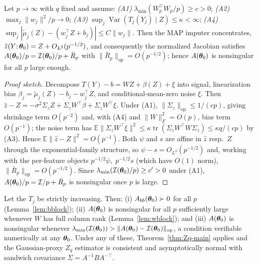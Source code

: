 \documentclass[twoside,11pt]{article}
\begin{document}
\begin{lemma}
\label{lem:wblock}
Let $p\to\infty$ with $q$ fixed and assume: \emph{(A1)} $\lambda_{\min}(W_p^\top W_p/p)\ge c>0$; \emph{(A2)} $\max_j\|w_j\|^2/p\to0$; \emph{(A3)} $\sup_j\operatorname{Var}(T_j(Y_j)\mid Z)\le\kappa<\infty$; \emph{(A4)} $\sup_j|\tilde\mu_j(Z)-(w_j^\top Z+b_j)|\le C\|w_j\|$. Then the MAP imputer concentrates, $\hat z(Y;{\bm{\theta}}_0)=Z+O_{L^2}(p^{-1/2})$, and consequently the normalized Jacobian satisfies $A({\bm{\theta}}_0)/p=\mathcal I({\bm{\theta}}_0)/p+\bar R_p$ with $\|\bar R_p\|_{\mathrm{op}}=O(p^{-1/2})$; hence $A({\bm{\theta}}_0)$ is nonsingular for all $p$ large enough.
\end{lemma}
\begin{proof}[Proof sketch]
Decompose $T(Y)-b=WZ+\beta(Z)+\xi$ into signal, linearization bias $\beta_j=\tilde\mu_j(Z)-b_j-w_j^\top Z$, and conditional-mean-zero noise $\xi$. Then $\hat z-Z=-\sigma^2\Sigma_z Z+\Sigma_z W^\top\beta+\Sigma_z W^\top\xi$. Under (A1), $\|\Sigma_z\|_{\mathrm{op}}\le 1/(cp)$, giving shrinkage term $O(p^{-2})$ and, with (A4) and $\|W\|_F^2=O(p)$, bias term $O(p^{-1})$; the noise term has $\mathbb E\|\Sigma_z W^\top\xi\|^2\le\kappa\operatorname{tr}(\Sigma_z W^\top W\Sigma_z)\le\kappa q/(cp)$ by (A3). Hence $\mathbb E\|\hat z-Z\|^2=O(p^{-1})$. Both $\psi$ and $s$ are affine in $\hat z$ resp.\ $Z$ through the exponential-family structure, so $\psi-s=O_{L^2}(p^{-1/2})$ and, working with the per-feature objects $p^{-1/2}\psi,\;p^{-1/2}s$ (which have $O(1)$ norm), $\|\bar R_p\|_{\mathrm{op}}=O(p^{-1/2})$. Since $\lambda_{\min}(\mathcal I({\bm{\theta}}_0)/p)\ge c'>0$ under (A1), $A({\bm{\theta}}_0)/p=\mathcal I/p+\bar R_p$ is nonsingular once $p$ is large.
\end{proof}

\begin{proposition}
\label{prop:gllvm-id}
Let the $T_j$ be strictly increasing. Then: \textup{(i)} $A_{bb}({\bm{\theta}}_0)\succ0$ for all $p$ (Lemma~\ref{lem:bblock}); \textup{(ii)} $A({\bm{\theta}}_0)$ is nonsingular for all $p$ sufficiently large whenever $W$ has full column rank (Lemma~\ref{lem:wblock}); and \textup{(iii)} $A({\bm{\theta}}_0)$ is nonsingular whenever $\lambda_{\min}(\mathcal I({\bm{\theta}}_0))>\|A({\bm{\theta}}_0)-\mathcal I({\bm{\theta}}_0)\|_{\mathrm{op}}$, a condition verifiable numerically at any ${\bm{\theta}}_0$. Under any of these, Theorem~\ref{thm:Zq-main} applies and the Gaussian-proxy $Z_q$ estimator is consistent and asymptotically normal with sandwich covariance $\Sigma=A^{-1}BA^{-\top}$.
\end{proposition}
\end{document}
